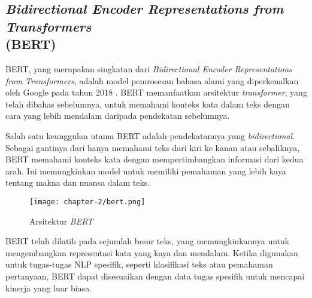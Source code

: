 \subsection{\textit{Bidirectional Encoder Representations from Transformers} \\ (BERT)}

BERT, yang merupakan singkatan dari \textit{Bidirectional Encoder Representations from Transformers}, adalah model pemrosesan bahasa alami yang diperkenalkan oleh Google pada tahun 2018 \parencite{bert}. BERT memanfaatkan arsitektur \textit{transformer}, yang telah dibahas sebelumnya, untuk memahami konteks kata dalam teks dengan cara yang lebih mendalam daripada pendekatan sebelumnya.

Salah satu keunggulan utama BERT adalah pendekatannya yang \textit{bidirectional}. Sebagai gantinya dari hanya memahami teks dari kiri ke kanan atau sebaliknya, BERT memahami konteks kata dengan mempertimbangkan informasi dari kedua arah. Ini memungkinkan model untuk memiliki pemahaman yang lebih kaya tentang makna dan nuansa dalam teks.

\begin{figure}[ht]
    \centering
    \texttt{[image: chapter-2/bert.png]}
    \caption{Arsitektur \textit{BERT} \parencite{bert}}
    \label{fig:bert}
\end{figure}

BERT telah dilatih pada sejumlah besar teks, yang memungkinkannya untuk mengembangkan representasi kata yang kaya dan mendalam. Ketika digunakan untuk tugas-tugas NLP spesifik, seperti klasifikasi teks atau pemahaman pertanyaan, BERT dapat disesuaikan dengan data tugas spesifik untuk mencapai kinerja yang luar biasa.
